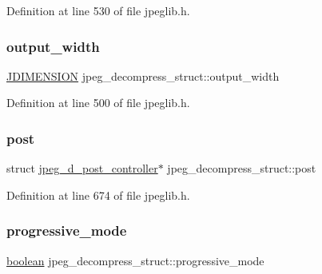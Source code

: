 Definition at line 530 of file jpeglib.\+h.

\mbox{\label{structjpeg__decompress__struct_a9a297d905de58707af17f12d05e392fb}} 
\subsubsection{\texorpdfstring{output\_width}{output\_width}}
{\footnotesize\ttfamily \mbox{\hyperlink{jmorecfg_8h_a04ed4674f6f1d0d50ec241531e38274f}{J\+D\+I\+M\+E\+N\+S\+I\+ON}} jpeg\+\_\+decompress\+\_\+struct\+::output\+\_\+width}



Definition at line 500 of file jpeglib.\+h.

\mbox{\label{structjpeg__decompress__struct_aa23ccd90094cf7cf11f8f688eb28988e}} 
\subsubsection{\texorpdfstring{post}{post}}
{\footnotesize\ttfamily struct \mbox{\hyperlink{structjpeg__d__post__controller}{jpeg\+\_\+d\+\_\+post\+\_\+controller}}$\ast$ jpeg\+\_\+decompress\+\_\+struct\+::post}



Definition at line 674 of file jpeglib.\+h.

\mbox{\label{structjpeg__decompress__struct_a6e2f9fd1cba287dc632070f3c8390d1c}} 
\subsubsection{\texorpdfstring{progressive\_mode}{progressive\_mode}}
{\footnotesize\ttfamily \mbox{\hyperlink{jmorecfg_8h_a7c6368b321bd9acd0149b030bb8275ed}{boolean}} jpeg\+\_\+decompress\+\_\+struct\+::progressive\+\_\+mode}



